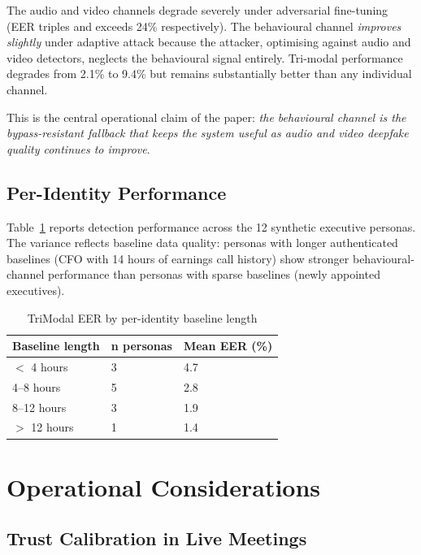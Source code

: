 \documentclass[sigconf,nonacm]{acmart}
\begin{document}
The audio and video channels degrade severely under adversarial
fine-tuning (EER triples and exceeds 24\% respectively). The
behavioural channel \emph{improves slightly} under adaptive attack
because the attacker, optimising against audio and video detectors,
neglects the behavioural signal entirely. Tri-modal performance
degrades from 2.1\% to 9.4\% but remains substantially better than
any individual channel.

This is the central operational claim of the paper: \emph{the
behavioural channel is the bypass-resistant fallback that keeps the
system useful as audio and video deepfake quality continues to
improve}.

\subsection{Per-Identity Performance}

Table~\ref{tab:peridentity} reports detection performance across the
12 synthetic executive personas. The variance reflects baseline data
quality: personas with longer authenticated baselines (CFO with 14
hours of earnings call history) show stronger behavioural-channel
performance than personas with sparse baselines (newly appointed
executives).

\begin{table}[h]
\caption{TriModal EER by per-identity baseline length}
\label{tab:peridentity}
\small
\begin{tabularx}{\columnwidth}{@{}p{3.0cm}X X@{}}
\toprule
\textbf{Baseline length} & \textbf{n personas} & \textbf{Mean EER (\%)} \\
\midrule
$<$ 4 hours      & 3  & 4.7 \\
4--8 hours       & 5  & 2.8 \\
8--12 hours      & 3  & 1.9 \\
$>$ 12 hours     & 1  & 1.4 \\
\bottomrule
\end{tabularx}
\end{table}

\section{Operational Considerations}

\subsection{Trust Calibration in Live Meetings}
\end{document}
